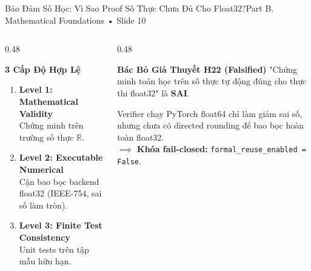 \documentclass[aspectratio=169, 10pt]{beamer}
\begin{document}
\begin{frame}{Bảo Đảm Số Học: Vì Sao Proof Số Thực Chưa Đủ Cho Float32?}{Part B. Mathematical Foundations • Slide 10}
    \begin{columns}
        \begin{column}{0.48\textwidth}
            \begin{block}{\textbf{3 Cấp Độ Hợp Lệ}}
                \small
                \begin{enumerate}
                    \item \textbf{Level 1: Mathematical Validity} \\ Chứng minh trên trường số thực $\mathbb{R}$.
                    \item \textbf{Level 2: Executable Numerical} \\ Cận bao bọc backend float32 (IEEE-754, sai số làm tròn).
                    \item \textbf{Level 3: Finite Test Consistency} \\ Unit tests trên tập mẫu hữu hạn.
                \end{enumerate}
            \end{block}
        \end{column}
        \begin{column}{0.48\textwidth}
            \begin{alertblock}{\textbf{Bác Bỏ Giả Thuyết H22 (Falsified)}}
                \small
                "Chứng minh toán học trên số thực tự động đúng cho thực thi float32" là \textbf{SAI}.
            \end{alertblock}
            \vspace{0.2cm}
            \small
            Verifier chạy PyTorch float64 chỉ làm giảm sai số, nhưng chưa có directed rounding để bao bọc hoàn toàn float32.
            \\ $\implies$ \textbf{Khóa fail-closed:} \texttt{formal\_reuse\_enabled = False}.
        \end{column}
    \end{columns}
\end{frame}
\end{document}
